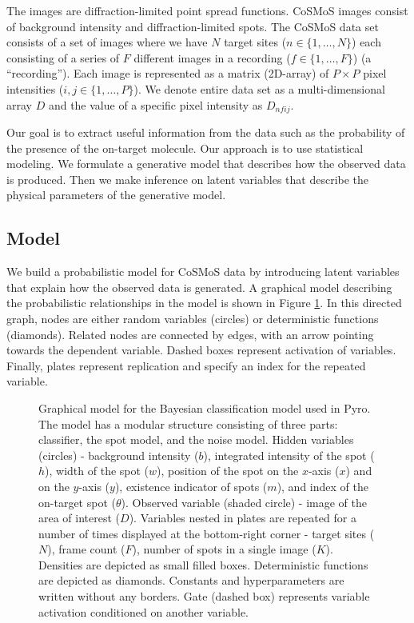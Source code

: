 The images are diffraction-limited point spread functions. CoSMoS images consist of background intensity and diffraction-limited spots. The CoSMoS data set consists of a set of images where we have $N$ target sites ($n \in \{1,\dots,N\}$) each consisting of a series of $F$ different images in a recording ($f \in \{1,\dots,F\}$) (a “recording”). Each image is represented as a matrix (2D-array) of $P \times P$ pixel intensities ($i,j \in \{1,\dots,P\}$). We denote entire data set as a multi-dimensional array $D$ and the value of a specific pixel intensity as $D_{nfij}$.

Our goal is to extract useful information from the data such as the probability of the presence of the on-target molecule. Our approach is to use statistical modeling. We formulate a generative model that describes how the observed data is produced. Then we make inference on latent variables that describe the physical parameters of the generative model. 

\subsection{Model}

We build a probabilistic model for CoSMoS data by introducing latent variables that explain how the observed data is generated. A graphical model describing the probabilistic relationships in the model is shown in Figure \ref{fig:graph}. In this directed graph, nodes are either random variables (circles) or deterministic functions (diamonds). Related nodes are connected by edges, with an arrow pointing towards the dependent variable. Dashed boxes represent activation of variables. Finally, plates represent replication and specify an index for the repeated variable.

\begin{figure}[ht]
  \begin{center}
    
  \end{center}
  \caption{Graphical model for the Bayesian classification model used in Pyro. The model has a modular structure consisting of three parts: classifier, the spot model, and the noise model. Hidden variables (circles) - background intensity ($b$), integrated intensity of the spot ($h$), width of the spot ($w$), position of the spot on the $x$-axis ($x$) and on the $y$-axis ($y$), existence indicator of spots ($m$), and index of the on-target spot ($\theta$). Observed variable (shaded circle) - image of the area of interest ($D$). Variables nested in plates are repeated for a number of times displayed at the bottom-right corner - target sites ($N$), frame count ($F$), number of spots in a single image ($K$). Densities are depicted as  small filled boxes. Deterministic functions are depicted as diamonds. Constants and hyperparameters are written without any borders. Gate (dashed box) represents variable activation conditioned on another variable.}
  \label{fig:graph}
\end{figure}

